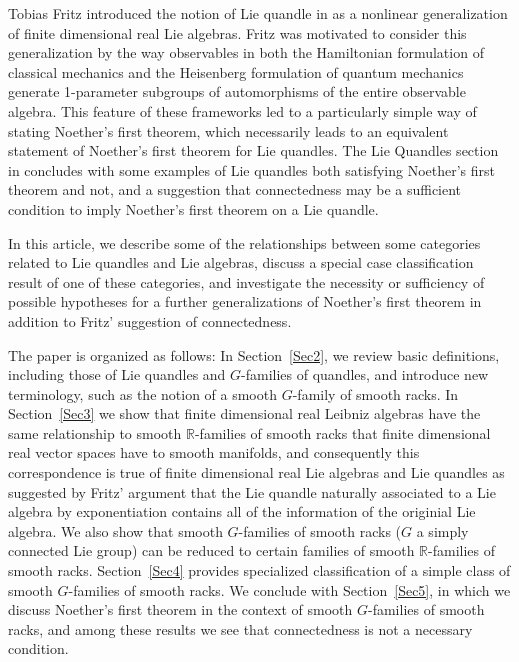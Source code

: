 \documentclass[12pt]{amsart}
\theoremstyle{plain}
\theoremstyle{definition}
\begin{document}

Tobias Fritz introduced the notion of Lie quandle in \cite{Fritz} as a nonlinear generalization of finite dimensional real Lie algebras. Fritz was motivated to consider this generalization by the way observables in both the Hamiltonian formulation of classical mechanics and the Heisenberg formulation of quantum mechanics generate 1-parameter subgroups of automorphisms of the entire observable algebra. This feature of these frameworks led to a particularly simple way of stating Noether's first theorem, which necessarily leads to an equivalent statement of Noether's first theorem for Lie quandles. The Lie Quandles section in \cite{Fritz} concludes with some examples of Lie quandles both satisfying Noether's first theorem and not, and a suggestion that connectedness may be a sufficient condition to imply Noether's first theorem on a Lie quandle. 



In this article, we describe some of the relationships between some categories related to Lie quandles and Lie algebras, discuss a special case classification result of one of these categories, and investigate the necessity or sufficiency of possible hypotheses for a further generalizations of Noether's first theorem in addition to Fritz' suggestion of connectedness.

The paper is organized as follows:  In Section~\ref{Sec2}, we review basic definitions, including those of Lie quandles and 
$G$-families of quandles, and introduce new terminology, such as the notion of a smooth $G$-family of smooth racks. In Section~\ref{Sec3} we show that finite dimensional real Leibniz algebras have the same relationship to smooth $\mathbb{R}$-families of smooth racks that finite dimensional real vector spaces have to smooth manifolds, and consequently this correspondence is true of finite dimensional real Lie algebras and Lie quandles as suggested by Fritz' argument that the Lie quandle naturally associated to a Lie algebra by exponentiation contains all of the information of the originial Lie algebra. We also show that smooth $G$-families of smooth racks ($G$ a simply connected Lie group) can be reduced to certain families of smooth $\mathbb{R}$-families of smooth racks. Section~\ref{Sec4} provides specialized classification of a simple class of smooth $G$-families of smooth racks. We conclude with Section~\ref{Sec5}, in which we discuss Noether's first theorem in the context of smooth $G$-families of smooth racks, and among these results we see that connectedness is not a necessary condition.
\end{document}
